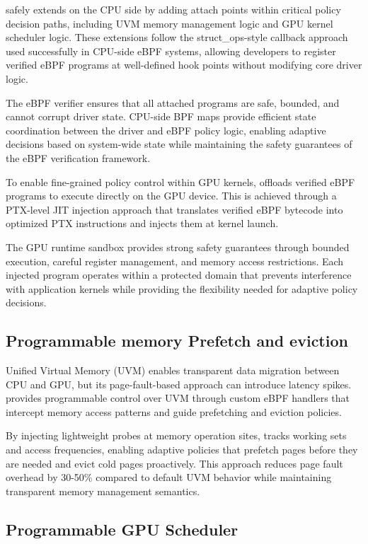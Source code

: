 \sys safely extends \sysdriver on the CPU side by adding attach points within critical policy decision paths, including UVM memory management logic and GPU kernel scheduler logic. These extensions follow the struct\_ops-style callback approach used successfully in CPU-side eBPF systems, allowing developers to register verified eBPF programs at well-defined hook points without modifying core driver logic.

The eBPF verifier ensures that all attached programs are safe, bounded, and cannot corrupt driver state. CPU-side BPF maps provide efficient state coordination between the driver and eBPF policy logic, enabling adaptive decisions based on system-wide state while maintaining the safety guarantees of the eBPF verification framework.

To enable fine-grained policy control within GPU kernels, \sys offloads verified eBPF programs to execute directly on the GPU device. This is achieved through a PTX-level JIT injection approach that translates verified eBPF bytecode into optimized PTX instructions and injects them at kernel launch.

The GPU runtime sandbox provides strong safety guarantees through bounded execution, careful register management, and memory access restrictions. Each injected program operates within a protected domain that prevents interference with application kernels while providing the flexibility needed for adaptive policy decisions.


\subsection{Programmable memory Prefetch and eviction}\label{sec:use_case_uvm}

\noindent Unified Virtual Memory (UVM) enables transparent data migration between CPU and GPU, but its page-fault-based approach can introduce latency spikes. \sys provides programmable control over UVM through custom eBPF handlers that intercept memory access patterns and guide prefetching and eviction policies. 


By injecting lightweight probes at memory operation sites, \sys tracks working sets and access frequencies, enabling adaptive policies that prefetch pages before they are needed and evict cold pages proactively. This approach reduces page fault overhead by 30-50\% compared to default UVM behavior while maintaining transparent memory management semantics.

\subsection{Programmable GPU Scheduler}\label{sec:use_case_scheduler}



